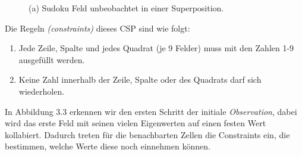 \documentclass[12pt, a4paper,twoside,openany]{report} %
\begin{document}
\begin{figure}[H]
    \centering
    \caption{(a) Sudoku Feld unbeobachtet in einer Superposition.}%
\end{figure}

Die Regeln \textit{(constraints)} dieses CSP sind wie folgt:
\begin{enumerate}
    \item Jede Zeile, Spalte und jedes Quadrat {(je 9 Felder)} muss mit den Zahlen 1-9 ausgefüllt werden.
    \item Keine Zahl innerhalb der Zeile, Spalte oder des Quadrats darf sich wiederholen.
\end{enumerate}

In Abbildung 3.3 erkennen wir den ersten Schritt der initiale \textit{Observation}, dabei wird das erste Feld mit seinen vielen Eigenwerten auf einen festen Wert kollabiert.
Dadurch treten für die benachbarten Zellen die Constraints ein, die bestimmen, welche Werte diese noch einnehmen können.
\end{document}
